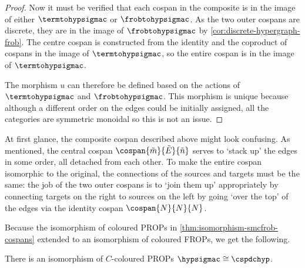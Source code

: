 \begin{proof}
    Now it must be verified that each cospan in the composite is in the image
    of either \(\termtohypsigmac\) or \(\frobtohypsigmac\).
    As the two outer cospans are discrete, they are in the image of
    \(\frobtohypsigmac\) by \cref{cor:discrete-hypergraph-frob}.
    The centre cospan is constructed from the identity and the coproduct of
    cospans in the image of \(\termtohypsigmac\), so the entire cospan is in the
    image of \(\termtohypsigmac\).

    The morphism \(u\) can therefore be defined based on the actions of
    \(\termtohypsigmac\) and \(\frobtohypsigmac\).
    This morphism is unique because although a different order on the edges
    could be initially assigned, all the categories are symmetric monoidal so
    this is not an issue.
\end{proof}

At first glance, the composite cospan described above might look confusing.
As mentioned, the central cospan \(\cospan{\tilde{m}}{\tilde{E}}{\tilde{n}}\)
serves to `stack up' the edges in some order, all detached from each other.
To make the entire cospan isomorphic to the original, the connections of the
sources and targets must be the same: the job of the two outer cospans is to
`join them up' appropriately by connecting targets on the right to sources on
the left by going `over the top' of the edges via the identity cospan
\(\cospan{N}{N}{N}\).

Because the isomorphism of coloured PROPs in
\cref{thm:isomorphism-smcfrob-cospans} extended to an isomorphism of coloured
FROPs, we get the following.


\begin{corollary}
    There is an isomorphism of \(C\)-coloured PROPs
    \(\hypsigmac \cong \cspdchyp\).
\end{corollary}